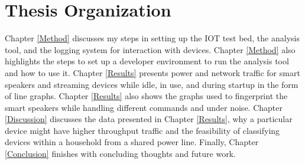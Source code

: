 \section{Thesis Organization}
Chapter \ref{Method} discusses my steps in setting up the IOT test bed, the analysis tool, and the logging system for interaction with devices. Chapter \ref{Method} also highlights the steps to set up a developer environment to run the analysis tool and how to use it. Chapter \ref{Results} presents power and network traffic for smart speakers and streaming devices while idle, in use, and during startup in the form of line graphs. Chapter \ref{Results} also shows the graphs used to fingerprint the smart speakers while handling different commands and under noise. Chapter \ref{Discussion} discusses the data presented in Chapter \ref{Results}, why a particular device might have higher throughput traffic and the feasibility of classifying devices within a household from a shared power line. Finally, Chapter \ref{Conclusion} finishes with concluding thoughts and future work.